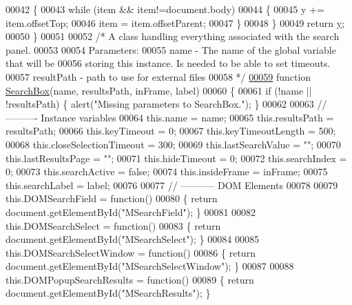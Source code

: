 \begin{DoxyCode}
00042   \{
00043      \textcolor{keywordflow}{while} (item && item!=document.body)
00044      \{
00045        y   += item.offsetTop;
00046        item = item.offsetParent;
00047      \}
00048   \}
00049   \textcolor{keywordflow}{return} \hyperlink{sensor_8h_a0ed6a908288e0cd87f79c1b5ab56d07c}{y};
00050 \}
00051 
00052 \textcolor{comment}{/* A class handling everything associated with the search panel.}
00053 \textcolor{comment}{}
00054 \textcolor{comment}{   Parameters:}
00055 \textcolor{comment}{   name - The name of the global variable that will be}
00056 \textcolor{comment}{          storing this instance.  Is needed to be able to set timeouts.}
00057 \textcolor{comment}{   resultPath - path to use for external files}
00058 \textcolor{comment}{*/}
\hypertarget{search_8js_source.tex_l00059}{}\hyperlink{search_8js_a52066106482f8136aa9e0ec859e8188f}{00059} \textcolor{keyword}{function} \hyperlink{search_8js_a52066106482f8136aa9e0ec859e8188f}{SearchBox}(name, resultsPath, inFrame, label)
00060 \{
00061   \textcolor{keywordflow}{if} (!name || !resultsPath) \{  alert(\textcolor{stringliteral}{"Missing parameters to SearchBox."}); \}
00062 
00063   \textcolor{comment}{// ---------- Instance variables}
00064   this.name                  = name;
00065   this.resultsPath           = resultsPath;
00066   this.keyTimeout            = 0;
00067   this.keyTimeoutLength      = 500;
00068   this.closeSelectionTimeout = 300;
00069   this.lastSearchValue       = \textcolor{stringliteral}{""};
00070   this.lastResultsPage       = \textcolor{stringliteral}{""};
00071   this.hideTimeout           = 0;
00072   this.searchIndex           = 0;
00073   this.searchActive          = \textcolor{keyword}{false};
00074   this.insideFrame           = inFrame;
00075   this.searchLabel           = label;
00076 
00077   \textcolor{comment}{// ----------- DOM Elements}
00078 
00079   this.DOMSearchField = \textcolor{keyword}{function}()
00080   \{  \textcolor{keywordflow}{return} document.getElementById(\textcolor{stringliteral}{"MSearchField"});  \}
00081 
00082   this.DOMSearchSelect = \textcolor{keyword}{function}()
00083   \{  \textcolor{keywordflow}{return} document.getElementById(\textcolor{stringliteral}{"MSearchSelect"});  \}
00084 
00085   this.DOMSearchSelectWindow = \textcolor{keyword}{function}()
00086   \{  \textcolor{keywordflow}{return} document.getElementById(\textcolor{stringliteral}{"MSearchSelectWindow"});  \}
00087 
00088   this.DOMPopupSearchResults = \textcolor{keyword}{function}()
00089   \{  \textcolor{keywordflow}{return} document.getElementById(\textcolor{stringliteral}{"MSearchResults"});  \}

\end{DoxyCode}
